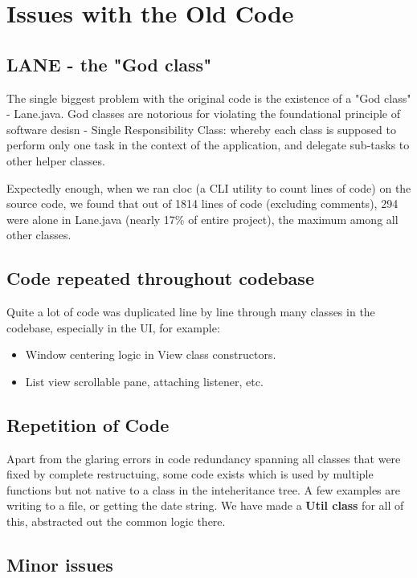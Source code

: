 \section{Issues with the Old Code}

\subsection{LANE - the "God class"}

The single biggest problem with the original code is the existence of a "God class" - Lane.java. God classes are notorious for violating the foundational principle of software desisn - Single Responsibility Class: whereby each class is supposed to perform only one task in the context of the application, and delegate sub-tasks to other helper classes.

Expectedly enough, when we ran \textrm{cloc} (a CLI utility to count lines of code) on the source code, we found that out of 1814 lines of code (excluding comments), 294 were alone in Lane.java (nearly 17\% of entire project), the maximum among all other classes.

\subsection{Code repeated throughout codebase}

Quite a lot of code was duplicated line by line through many classes in the codebase, especially in the UI, for example:

\begin{itemize}
\item Window centering logic in View class constructors.
\item List view scrollable pane, attaching listener, etc.
\end{itemize}

\subsection{Repetition of Code}

Apart from the glaring errors in code redundancy spanning all classes that were fixed by complete restructuing, some code exists which is used by multiple functions but not native to a class in the inteheritance tree. A few examples are writing to a file, or getting the date string. We have made a \textbf{Util class} for all of this, abstracted out the common logic there.

\subsection{Minor issues}
